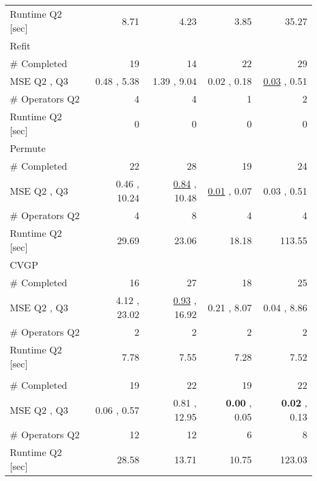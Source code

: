 \begin{tabularx}{\textwidth}{lRRRR}
\qquad Runtime Q2 [sec]  &  8.71  &  4.23  &  3.85  &  35.27  \\
Refit  &     &     &     &     \\
\qquad  \# Completed  &  19\phantom{.00}  &  14\phantom{.00}  &  22\phantom{.00}  &  29\phantom{.00}  \\
\qquad MSE Q2 ,  Q3  &  0.48  ,  5.38  &  1.39  ,  9.04  &  0.02  ,  0.18  &  \underline{0.03}  ,  0.51  \\
\qquad \# Operators Q2  &  4\phantom{.00}  &  4\phantom{.00}  &  1\phantom{.00}  &  2\phantom{.00}  \\
\qquad Runtime Q2 [sec]  &  0\phantom{.00}  &  0\phantom{.00}  &  0\phantom{.00}  &  0\phantom{.00}  \\
Permute  &     &     &     &     \\
\qquad  \# Completed  &  22\phantom{.00}  &  28\phantom{.00}  &  19\phantom{.00}  &  24\phantom{.00}  \\
\qquad MSE Q2 ,  Q3  &  0.46  ,  10.24  &  \underline{0.84}  ,  10.48  &  \underline{0.01}  ,  0.07  &  0.03  ,  0.51  \\
\qquad \# Operators Q2  &  4\phantom{.00}  &  8\phantom{.00}  &  4\phantom{.00}  &  4\phantom{.00}  \\
\qquad Runtime Q2 [sec]  &  29.69  &  23.06  &  18.18  &  113.55  \\
CVGP  &     &     &     &     \\
\qquad  \# Completed  &  16\phantom{.00}  &  27\phantom{.00}  &  18\phantom{.00}  &  25\phantom{.00}  \\
\qquad MSE Q2 ,  Q3  &  4.12  ,  23.02  &  \underline{0.93}  ,  16.92  &  0.21  ,  8.07  &  0.04  ,  8.86  \\
\qquad \# Operators Q2  &  2\phantom{.00}  &  2\phantom{.00}  &  2\phantom{.00}  &  2\phantom{.00}  \\
\qquad Runtime Q2 [sec]  &  7.78  &  7.55  &  7.28  &  7.52  \\
\ours{}  &     &     &     &     \\
\qquad  \# Completed  &  19\phantom{.00}  &  22\phantom{.00}  &  19\phantom{.00}  &  22\phantom{.00}  \\
\qquad MSE Q2 ,  Q3  &  0.06  ,  0.57  &  0.81  ,  12.95  &  \textbf{0.00}  ,  0.05  &  \textbf{0.02}  ,  0.13  \\
\qquad \# Operators Q2  &  12\phantom{.00}  &  12\phantom{.00}  &  6\phantom{.00}  &  8\phantom{.00}  \\
\qquad Runtime Q2 [sec]  &  28.58  &  13.71  &  10.75  &  123.03  \\
\bottomrule
\end{tabularx}
